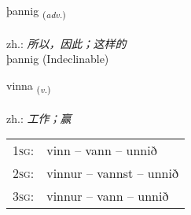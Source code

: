 \documentclass[frontgrid, backgrid]{flacards}\usepackage[]{graphicx}\usepackage[]{xcolor}
\begin{document}

\renewcommand{\flhead}{\vskip5pt \fboxsep=0pt {\small\bfseries\footnotesize Atviksorð | 副词}}
\renewcommand{\fcfoot}{\vskip5pt \fboxsep=0pt \hspace{2pt}{\small\bfseries\footnotesize 1K}}

\renewcommand{\blhead}{\vskip5pt {\small\bfseries\footnotesize Atviksorð | 副词 }}
\renewcommand{\bcfoot}{\vskip5pt \hspace{2pt}{\small\bfseries\footnotesize 1K}}


{þannig \small{\textsubscript{(\textit{adv.})}} \\[1ex]
\textphonetic{[θanɪɣ]} \\
zh.: \emph{所以，因此；这样的} \\  [2ex]
þannig (Indeclinable)}

\renewcommand{\flhead}{\vskip5pt \fboxsep=0pt {\small\bfseries\footnotesize Sagnorð | 动词}}
\renewcommand{\fcfoot}{\vskip5pt \fboxsep=0pt \hspace{2pt}{\small\bfseries\footnotesize 1K}}

\renewcommand{\blhead}{\vskip5pt {\small\bfseries\footnotesize Sagnorð | 动词 }}
\renewcommand{\bcfoot}{\vskip5pt \hspace{2pt}{\small\bfseries\footnotesize 1K}}


{vinna \small{\textsubscript{(\textit{v.})}} \\[1ex] %
\textphonetic{[vɪna]} \\
zh.: \emph{工作；赢} \\  [2ex]
\renewcommand*{\arraystretch}{0.8}
\begin{tabular}{p{1cm}l}
\textsc{1sg}: & vinn -- vann -- unnið \\ 
\textsc{2sg}: & vinnur -- vannst -- unnið \\ 
\textsc{3sg}: & vinnur -- vann -- unnið \\ 
\end{tabular}
}

\end{document}
